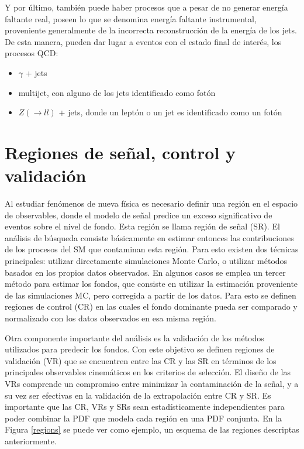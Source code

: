 Y por último, también puede haber procesos que a pesar de no generar energía faltante real, poseen lo que se denomina energía faltante instrumental, proveniente generalmente de la incorrecta reconstrucción de la energía de los jets. De esta manera, pueden dar lugar a eventos con el estado final de interés, los procesos QCD:

\begin{itemize}

	\item $\gamma$ + jets

	\item multijet, con alguno de los jets identificado como fotón

	\item $Z(\rightarrow ll)$ + jets, donde un leptón o un jet es identificado como un fotón

\end{itemize}



\section{Regiones de señal, control y validación}

Al estudiar fenómenos de nueva física es necesario definir una región en el espacio de observables, donde el modelo de señal predice un exceso significativo de eventos sobre el nivel de fondo. Esta región se llama región de señal (SR). El análisis de búsqueda consiste básicamente en estimar entonces las contribuciones de los procesos del SM que contaminan esta región. Para esto existen dos técnicas principales: utilizar directamente simulaciones Monte Carlo, o utilizar métodos basados en los propios datos observados. En algunos casos se emplea un tercer método para estimar los fondos, que consiste en utilizar la estimación proveniente de las simulaciones MC, pero corregida a partir de los datos. Para esto se definen regiones de control (CR) en las cuales el fondo dominante pueda ser comparado y normalizado con los datos observados en esa misma región. 

Otra componente importante del análisis es la validación de los métodos utilizados para predecir los fondos. Con este objetivo se definen regiones de validación (VR) que se encuentren entre las CR y las SR en términos de los principales observables cinemáticos en los criterios de selección. El diseño de las VRs comprende un compromiso entre minimizar la contaminación de la señal, y a su vez ser efectivas en la validación de la extrapolación entre CR y SR. Es importante que las CR, VRs y SRs sean estadísticamente independientes para poder combinar la PDF que modela cada región en una PDF conjunta. En la Figura \ref{regions} se puede ver como ejemplo, un esquema de las regiones descriptas anteriormente.

